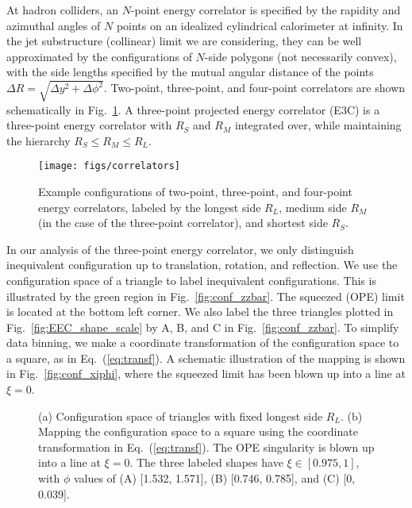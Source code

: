 \documentclass[aps,prl,twocolumn,showpacs,10pt,superscriptaddress,preprintnumbers,nofootinbib,longbibliography]{revtex4-1}
\DeclareRobustCommand{\Fig}[1]{Fig.~\ref{#1}}
\DeclareRobustCommand{\Eq}[1]{Eq.~(\ref{#1})}
\begin{document}
At hadron colliders, an $N$-point energy correlator is specified by the rapidity and azimuthal angles of $N$ points on an idealized cylindrical calorimeter at infinity.
%
In the jet substructure (collinear) limit we are considering, they can be well approximated by the configurations of $N$-side polygons (not necessarily convex), with the side lengths specified by the mutual angular distance of the points $\Delta R = \sqrt{\Delta y^2 + \Delta \phi^2}$.
%
Two-point, three-point, and four-point correlators are shown schematically in \Fig{fig:example}.
%
A three-point projected energy correlator (E3C) is a three-point energy correlator with $R_S$ and $R_M$ integrated over, while maintaining the hierarchy $R_S \leq R_M \leq R_L$.

\begin{figure}[h!]
\texttt{[image: figs/correlators]}
\caption{Example configurations of two-point, three-point, and four-point energy correlators, labeled by the longest side $R_L$, medium side $R_M$ (in the case of the three-point correlator), and shortest side $R_S$.}
\label{fig:example}
\end{figure}

In our analysis of the three-point energy correlator, we only distinguish inequivalent configuration up to translation, rotation, and reflection.
%
We use the configuration space of a triangle to label inequivalent configurations.
%
This is illustrated by the green region in \Fig{fig:conf_zzbar}.
%
The squeezed (OPE) limit is located at the bottom left corner.
%
We also label the three triangles plotted in \Fig{fig:EEC_shape_scale} by A, B, and C in \Fig{fig:conf_zzbar}.
%
To simplify data binning, we make a coordinate transformation of the configuration space to a square, as in \Eq{eq:transf}.
%
A schematic illustration of the mapping is shown in \Fig{fig:conf_xiphi}, where the squeezed limit has been blown up into a line at $\xi = 0$.

\begin{figure}[h!]
\qquad\qquad
{}
\caption{
%
(a) Configuration space of triangles with fixed longest side $R_L$.
%
(b) Mapping the configuration space to a square using the coordinate transformation in \Eq{eq:transf}.  
%
The OPE singularity is blown up into a line at $\xi = 0$.
%
The three labeled shapes have $\xi \in [0.975, 1]$, with $\phi$ values of (A) [1.532, 1.571], (B) [0.746, 0.785], and (C) [0, 0.039].
}
\label{fig:configuration}
\end{figure}
\end{document}

